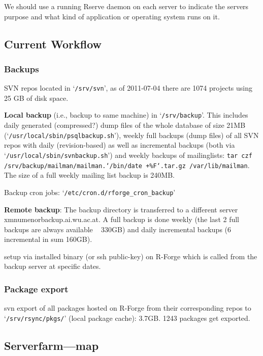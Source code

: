 \documentclass[a4paper]{article}
\let\code=\texttt
\newcommand{\class}[1]{`\code{#1}'}
\let\file=\class
\begin{document}
We should use a running Rserve daemon on each server to indicate the
servers purpose and what kind of application or operating system runs
on it.

\subsection{Current Workflow}

\subsubsection{Backups}

SVN repos located in \file{/srv/svn}, as of 2011-07-04 there are 1074
projects using 25 GB of disk space.

\textbf{Local backup} (i.e., backup to same machine) in
\file{/srv/backup}. This includes daily generated (compressed?) dump
files of the whole database of size 21MB
(\file{/usr/local/sbin/psqlbackup.sh}), weekly full backups (dump
files) of all SVN repos with daily (revision-based) as well as
incremental backups (both via \file{/usr/local/sbin/svnbackup.sh}) and
weekly backups of mailinglists: \code{tar czf
  /srv/backup/mailman/mailman.`/bin/date +\%F`.tar.gz
  /var/lib/mailman}. The size of a full weekly mailing list backup is
240MB.

Backup cron jobs: \file{/etc/cron.d/rforge_cron_backup}

\textbf{Remote backup}: The backup directory is transferred to a
different server xmnumenorbackup.ai.wu.ac.at. A full backup is done
weekly (the last 2 full backups are always available ~ 330GB) and
daily incremental backups (6 incremental  in sum 160GB).

setup via installed binary  (or ssh public-key) on R-Forge which is called from the backup
server at specific dates.

\subsubsection{Package export}

svn export of all packages hosted on R-Forge from their corresponding
repos to \file{/srv/rsync/pkgs/} (local package cache): 3.7GB. 1243
packages get exported. 



\subsection{Serverfarm---map}
\end{document}
